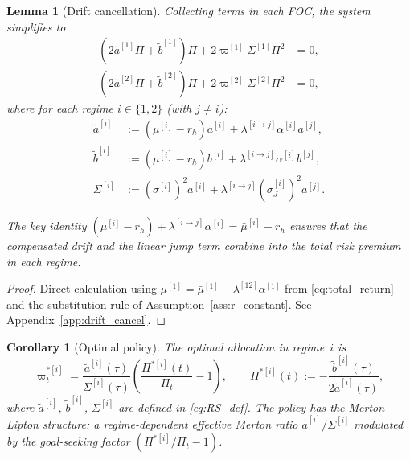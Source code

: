 \documentclass[11pt,a4paper]{article}
\numberwithin{equation}{section}
\newtheorem{lemma}[theorem]{Lemma}
\newtheorem{corollary}[theorem]{Corollary}
\begin{document}
\begin{lemma}[Drift cancellation]\label{lem:drift_cancel}
Collecting terms in each FOC, the system simplifies to
\begin{align}
(2\tilde{a}^{[1]} \Pi + \tilde{b}^{[1]})\Pi + 2\varpi^{[1]} \Sigma^{[1]} \Pi^2 &= 0, \label{eq:foc_clean1} \\
(2\tilde{a}^{[2]} \Pi + \tilde{b}^{[2]})\Pi + 2\varpi^{[2]} \Sigma^{[2]} \Pi^2 &= 0, \label{eq:foc_clean2}
\end{align}
where for each regime $i \in \{1,2\}$ (with $j \neq i$):
\begin{equation}\label{eq:RS_def}
\begin{aligned}
\tilde{a}^{[i]} &:= (\mu^{[i]} - r_h) a^{[i]} + \lambda^{[i\to j]} \alpha^{[i]} a^{[j]} , \\
\tilde{b}^{[i]} &:= (\mu^{[i]} - r_h) b^{[i]} + \lambda^{[i\to j]} \alpha^{[i]} b^{[j]}, \\
\Sigma^{[i]} &:= (\sigma^{[i]})^2 a^{[i]} + \lambda^{[i\to j]} (\sigma_J^{[i]})^2 a^{[j]}.
\end{aligned}
\end{equation}


The key identity $(\mu^{[i]} - r_h) + \lambda^{[i\to j]} \alpha^{[i]} = \bar{\mu}^{[i]} - r_h$ ensures that the compensated drift and the linear jump term combine into the total risk premium in each regime.
\end{lemma}

\begin{proof}
Direct calculation using $\mu^{[1]} = \bar{\mu}^{[1]} - \lambda^{[12]} \alpha^{[1]}$ from \eqref{eq:total_return} and the substitution rule of Assumption~\ref{ass:r_constant}. See Appendix~\ref{app:drift_cancel}.
\end{proof}

\begin{corollary}[Optimal policy]\label{cor:optimal_policy}
The optimal allocation in regime~$i$ is
\begin{equation}\label{eq:optimal_w}
\varpi^{*[i]}_t = \frac{\tilde{a}^{[i]}(\tau)}{\Sigma^{[i]}(\tau)} \left(\frac{\Pi^{*[i]}(t)}{\Pi_t} - 1\right), \qquad \Pi^{*[i]}(t) := -\frac{\tilde{b}^{[i]}(\tau)}{2\tilde{a}^{[i]}(\tau)},
\end{equation}
where $\tilde{a}^{[i]}$, $\tilde{b}^{[i]}$, $\Sigma^{[i]}$ are defined in \eqref{eq:RS_def}. The policy has the Merton--Lipton structure: a regime-dependent effective Merton ratio $\tilde{a}^{[i]}/\Sigma^{[i]}$ modulated by the goal-seeking factor $(\Pi^{*[i]}/\Pi_t - 1)$.
\end{corollary}
\end{document}
